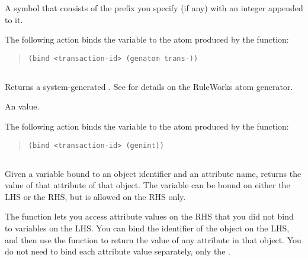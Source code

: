 \ReturnValue

A symbol that consists of the prefix you specify (if any) with an
integer appended to it.

\Example

The following  action binds the variable 
to the atom produced by the  function:

\begin{quote}
\begin{verbatim}
(bind <transaction-id> (genatom trans-))
\end{verbatim}
\end{quote}

\subsection{}

Returns a system-generated . See  for details
on the RuleWorks atom generator.

\Format


\ReturnValue

An  value.

\Example

The following  action binds the variable 
to the atom produced by the  function:

\begin{quote}
\begin{verbatim}
(bind <transaction-id> (genint))
\end{verbatim}
\end{quote}

\subsection{}

Given a variable bound to an object identifier and an attribute name,
returns the value of that attribute of that object. The variable can
be bound on either the LHS or the RHS, but  is allowed on the
RHS only.

The  function lets you access attribute values on the RHS that
you did not bind to variables on the LHS. You can bind the identifier
of the object on the LHS, and then use the  function to return
the value of any attribute in that object.  You do not need to bind
each attribute value separately, only the .

